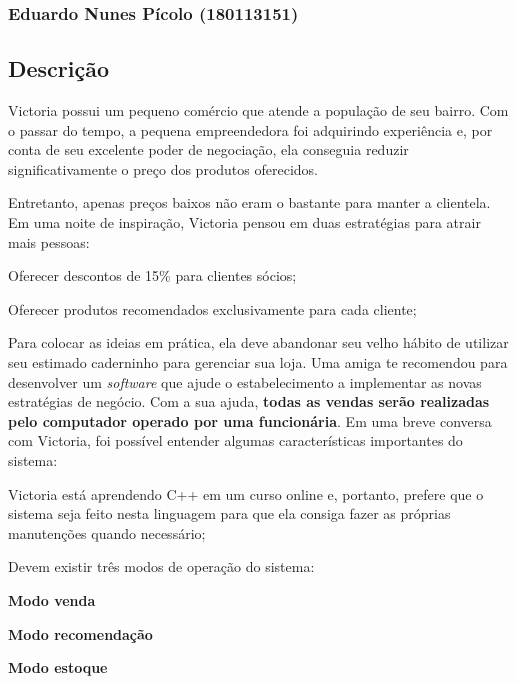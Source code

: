 \subsubsection*{Eduardo Nunes Pícolo (180113151)}

\subsection*{Descrição}

Victoria possui um pequeno comércio que atende a população de seu bairro. Com o passar do tempo, a pequena empreendedora foi adquirindo experiência e, por conta de seu excelente poder de negociação, ela conseguia reduzir significativamente o preço dos produtos oferecidos.

Entretanto, apenas preços baixos não eram o bastante para manter a clientela. Em uma noite de inspiração, Victoria pensou em duas estratégias para atrair mais pessoas\+:
\begin{DoxyItemize}
\item Oferecer descontos de 15\% para clientes sócios;
\item Oferecer produtos recomendados exclusivamente para cada cliente;
\end{DoxyItemize}

Para colocar as ideias em prática, ela deve abandonar seu velho hábito de utilizar seu estimado caderninho para gerenciar sua loja. Uma amiga te recomendou para desenvolver um {\itshape software} que ajude o estabelecimento a implementar as novas estratégias de negócio. Com a sua ajuda, {\bfseries todas as vendas serão realizadas pelo computador operado por uma funcionária}. Em uma breve conversa com Victoria, foi possível entender algumas características importantes do sistema\+:
\begin{DoxyItemize}
\item Victoria está aprendendo C++ em um curso online e, portanto, prefere que o sistema seja feito nesta linguagem para que ela consiga fazer as próprias manutenções quando necessário;
\item Devem existir três modos de operação do sistema\+:
\begin{DoxyItemize}
\item {\bfseries Modo venda}
\item {\bfseries Modo recomendação}
\item {\bfseries Modo estoque}
\end{DoxyItemize}
\end{DoxyItemize}


